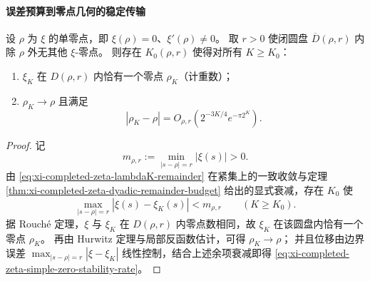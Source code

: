 \paragraph{误差预算到零点几何的稳定传输}
\begin{theorem}[二进递归下简单零点的超指数稳定性]\label{thm:xi-completed-zeta-simple-zero-stability}
设 \(\rho\) 为 \(\xi\) 的单零点，即 \(\xi(\rho)=0\)、\(\xi'(\rho)\neq0\)。
取 \(r>0\) 使闭圆盘 \(\overline{D}(\rho,r)\) 内除 \(\rho\) 外无其他 \(\xi\)-零点。
则存在 \(K_0(\rho,r)\) 使得对所有 \(K\ge K_0\)：
\begin{enumerate}
  \item \(\xi_K\) 在 \(D(\rho,r)\) 内恰有一个零点 \(\rho_K\)（计重数）；
  \item \(\rho_K\to\rho\) 且满足
  \begin{equation}\label{eq:xi-completed-zeta-simple-zero-stability-rate}
  |\rho_K-\rho|
  =O_{\rho,r}\!\left(2^{-3K/4}e^{-\pi2^K}\right).
  \end{equation}
\end{enumerate}
\end{theorem}
\begin{proof}
记
\[
m_{\rho,r}:=\min_{|s-\rho|=r}|\xi(s)|>0.
\]
由 \eqref{eq:xi-completed-zeta-lambdaK-remainder} 在紧集上的一致收敛与定理 \ref{thm:xi-completed-zeta-dyadic-remainder-budget} 给出的显式衰减，存在 \(K_0\) 使
\[
\max_{|s-\rho|=r}|\xi(s)-\xi_K(s)|<m_{\rho,r}\qquad(K\ge K_0).
\]
据 Rouch\'e 定理，\(\xi\) 与 \(\xi_K\) 在 \(D(\rho,r)\) 内零点数相同，故 \(\xi_K\) 在该圆盘内恰有一个零点 \(\rho_K\)。
再由 Hurwitz 定理与局部反函数估计，可得 \(\rho_K\to\rho\)；
并且位移由边界误差 \(\max_{|s-\rho|=r}|\xi-\xi_K|\) 线性控制，结合上述余项衰减即得 \eqref{eq:xi-completed-zeta-simple-zero-stability-rate}。
\end{proof}

